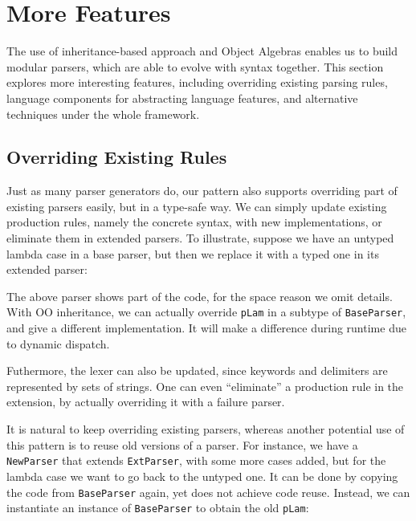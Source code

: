\section{More Features}

The use of inheritance-based approach and Object Algebras enables us to build modular parsers, which are able to evolve with syntax together. This section explores more interesting features, including overriding existing parsing rules, language components for abstracting language features, and alternative techniques under the whole framework.

\subsection{Overriding Existing Rules}

Just as many parser generators do, our pattern also supports overriding part of existing parsers easily, but in a type-safe way.
We can simply update existing production rules, namely the concrete syntax, with new implementations, or eliminate them in extended parsers.
To illustrate, suppose we have an untyped lambda case in a base parser, but then we replace it with a typed one in its extended parser:

The above parser shows part of the code, for the space reason we omit details. With OO inheritance, we can actually override \lstinline{pLam}
in a subtype of \lstinline{BaseParser}, and give a different implementation. It will make a difference during runtime due to dynamic
dispatch.

Futhermore, the lexer can also be updated, since keywords and delimiters are represented by sets of strings.
One can even ``eliminate'' a production rule in the extension, by actually overriding it with a failure parser.

It is natural to keep overriding existing parsers, whereas another potential use of this pattern is to reuse old versions of a parser. For instance,
we have a \lstinline{NewParser} that extends \lstinline{ExtParser}, with some more cases added, but for the lambda case we want to go back to the untyped one.
It can be done by copying the code from \lstinline{BaseParser} again, yet does not achieve code reuse. Instead, we can instantiate an instance of \lstinline{BaseParser} to obtain the old \lstinline{pLam}:

